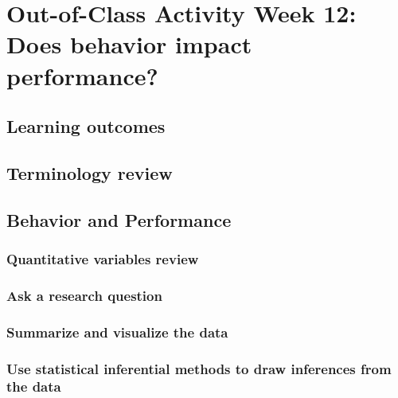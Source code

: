 \documentclass[
]{report}
\begin{document}
\hypertarget{out-of-class-activity-week-12-does-behavior-impact-performance}{%
\section{Out-of-Class Activity Week 12: Does behavior impact performance?}\label{out-of-class-activity-week-12-does-behavior-impact-performance}}

\hypertarget{learning-outcomes-23}{%
\subsection{Learning outcomes}\label{learning-outcomes-23}}

\hypertarget{terminology-review-19}{%
\subsection{Terminology review}\label{terminology-review-19}}

\hypertarget{behavior-and-performance}{%
\subsection{Behavior and Performance}\label{behavior-and-performance}}

\hypertarget{quantitative-variables-review}{%
\subsubsection*{Quantitative variables review}\label{quantitative-variables-review}}

\hypertarget{ask-a-research-question-4}{%
\subsubsection*{Ask a research question}\label{ask-a-research-question-4}}

\hypertarget{summarize-and-visualize-the-data-4}{%
\subsubsection*{Summarize and visualize the data}\label{summarize-and-visualize-the-data-4}}

\hypertarget{use-statistical-inferential-methods-to-draw-inferences-from-the-data-3}{%
\subsubsection*{Use statistical inferential methods to draw inferences from the data}\label{use-statistical-inferential-methods-to-draw-inferences-from-the-data-3}}
\end{document}
